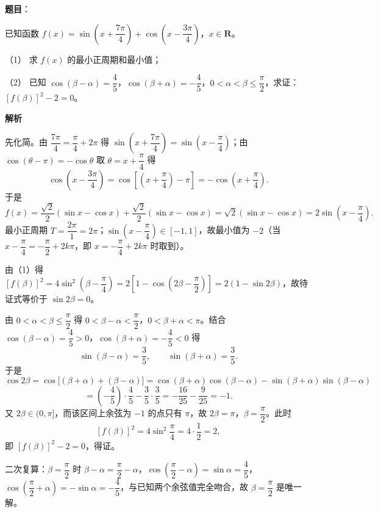 \begin{answer}

\textbf{题目}：

已知函数 $f(x)=\sin\left(x+\dfrac{7\pi}{4}\right)+\cos\left(x-\dfrac{3\pi}{4}\right)$，$x\in\mathbf R$。

（1） 求 $f(x)$ 的最小正周期和最小值；

（2） 已知 $\cos(\beta-\alpha)=\dfrac45$，$\cos(\beta+\alpha)=-\dfrac45$，$0<\alpha<\beta\leqslant\dfrac{\pi}{2}$，求证：$[f(\beta)]^2-2=0$。

\textbf{解析}

先化简。由 $\dfrac{7\pi}{4}=\dfrac{\pi}{4}+2\pi$ 得 $\sin\left(x+\dfrac{7\pi}{4}\right)=\sin\left(x-\dfrac{\pi}{4}\right)$；由 $\cos(\theta-\pi)=-\cos\theta$ 取 $\theta=x+\dfrac{\pi}{4}$ 得
\nopagebreak[4]
\[\cos\left(x-\frac{3\pi}{4}\right)=\cos\left[\left(x+\frac{\pi}{4}\right)-\pi\right]=-\cos\left(x+\frac{\pi}{4}\right).\]
于是
\nopagebreak[4]
\[f(x)=\frac{\sqrt2}{2}(\sin x-\cos x)+\frac{\sqrt2}{2}(\sin x-\cos x)=\sqrt2(\sin x-\cos x)=2\sin\left(x-\frac{\pi}{4}\right).\]
最小正周期 $T=\dfrac{2\pi}{1}=2\pi$；$\sin\left(x-\dfrac{\pi}{4}\right)\in[-1,1]$，故最小值为 $-2$（当 $x-\dfrac{\pi}{4}=-\dfrac{\pi}{2}+2k\pi$，即 $x=-\dfrac{\pi}{4}+2k\pi$ 时取到）。

由（1）得 $[f(\beta)]^2=4\sin^2\left(\beta-\dfrac{\pi}{4}\right)=2\left[1-\cos\left(2\beta-\dfrac{\pi}{2}\right)\right]=2(1-\sin2\beta)$，故待证式等价于 $\sin2\beta=0$。

由 $0<\alpha<\beta\leqslant\dfrac{\pi}{2}$ 得 $0<\beta-\alpha<\dfrac{\pi}{2}$，$0<\beta+\alpha<\pi$。结合 $\cos(\beta-\alpha)=\dfrac45>0$，$\cos(\beta+\alpha)=-\dfrac45<0$ 得
\nopagebreak[4]
\[\sin(\beta-\alpha)=\frac35,\qquad \sin(\beta+\alpha)=\frac35.\]
于是
\nopagebreak[4]
\[\cos2\beta=\cos\bigl[(\beta+\alpha)+(\beta-\alpha)\bigr]=\cos(\beta+\alpha)\cos(\beta-\alpha)-\sin(\beta+\alpha)\sin(\beta-\alpha)\]
\nopagebreak[4]
\[=\left(-\frac45\right)\cdot\frac45-\frac35\cdot\frac35=-\frac{16}{25}-\frac{9}{25}=-1.\]
又 $2\beta\in(0,\pi]$，而该区间上余弦为 $-1$ 的点只有 $\pi$，故 $2\beta=\pi$，$\beta=\dfrac{\pi}{2}$。此时
\nopagebreak[4]
\[[f(\beta)]^2=4\sin^2\frac{\pi}{4}=4\cdot\frac12=2,\]
即 $[f(\beta)]^2-2=0$，得证。

二次复算：$\beta=\dfrac{\pi}{2}$ 时 $\beta-\alpha=\dfrac{\pi}{2}-\alpha$，$\cos\left(\dfrac{\pi}{2}-\alpha\right)=\sin\alpha=\dfrac45$，$\cos\left(\dfrac{\pi}{2}+\alpha\right)=-\sin\alpha=-\dfrac45$，与已知两个余弦值完全吻合，故 $\beta=\dfrac{\pi}{2}$ 是唯一解。



\end{answer}
